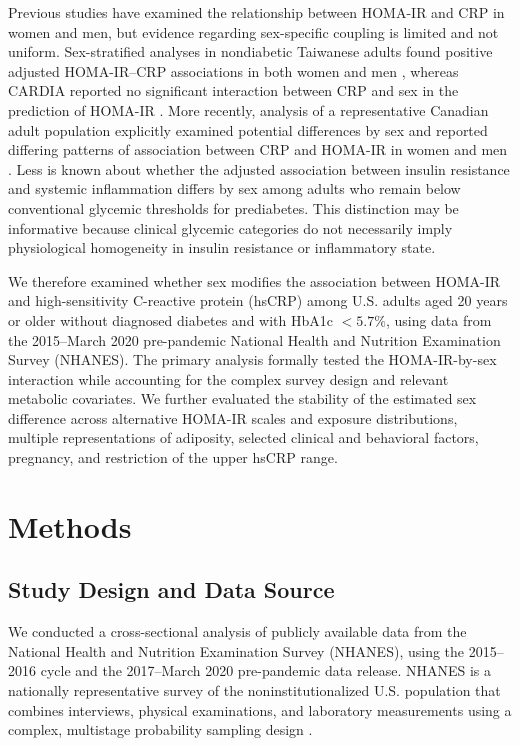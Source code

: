 \documentclass[11pt]{article}
\begin{document}
Previous studies have examined the relationship between HOMA-IR and CRP in
women and men, but evidence regarding sex-specific coupling is limited and
not uniform. Sex-stratified analyses in nondiabetic Taiwanese adults found
positive adjusted HOMA-IR--CRP associations in both women and men
\citep{Chou2010CRPInsulinResistance}, whereas CARDIA reported no significant
interaction between CRP and sex in the prediction of HOMA-IR
\citep{Park2009InflammationHOMA}. More recently, analysis of a representative
Canadian adult population explicitly examined potential differences by sex
and reported differing patterns of association between CRP and HOMA-IR in
women and men \citep{Shahid2023CRPHOMA}. Less is known about whether the
adjusted association between insulin resistance and systemic inflammation
differs by sex among adults who remain below conventional glycemic thresholds
for prediabetes. This distinction may be informative because clinical
glycemic categories do not necessarily imply physiological homogeneity in
insulin resistance or inflammatory state.

We therefore examined whether sex modifies the association between HOMA-IR
and high-sensitivity C-reactive protein (hsCRP) among U.S. adults aged 20
years or older without diagnosed diabetes and with HbA1c $<5.7\%$, using
data from the 2015--March 2020 pre-pandemic National Health and Nutrition
Examination Survey (NHANES). The primary analysis formally tested the
HOMA-IR-by-sex interaction while accounting for the complex survey design
and relevant metabolic covariates. We further evaluated the stability of
the estimated sex difference across alternative HOMA-IR scales and exposure
distributions, multiple representations of adiposity, selected clinical and
behavioral factors, pregnancy, and restriction of the upper hsCRP range.


\section{Methods}

\subsection{Study Design and Data Source}

We conducted a cross-sectional analysis of publicly available data from the
National Health and Nutrition Examination Survey (NHANES), using the
2015--2016 cycle and the 2017--March 2020 pre-pandemic data release.
NHANES is a nationally representative survey of the noninstitutionalized
U.S. population that combines interviews, physical examinations, and
laboratory measurements using a complex, multistage probability sampling
design \citep{NHANES2017_2020Guidelines}.
\end{document}
